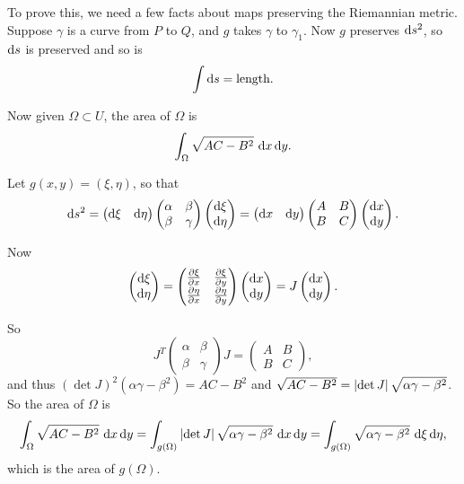 \documentclass{notes}
\theoremstyle{plain}
\begin{document}
To prove this, we need a few facts about maps preserving the Riemannian metric.
Suppose $\gamma$ is a curve from $P$ to $Q$, and $g$ takes $\gamma$ to
$\gamma_1$.  Now $g$ preserves $\mathrm{d} s^2$, so $\mathrm{d} s$ is preserved and so is
\[
\int \mathrm{d} s = \text{length}.
\]

Now given $\Omega \subset U$, the area of $\Omega$ is
\[
\int_\Omega \sqrt{A C - B^2}\ \mathrm{d} x\, \mathrm{d} y.
\]

Let $g(x,y) = (\xi,\eta)$, so that
\[
\mathrm{d} s^2=
\left(
\begin{matrix}
\mathrm{d}\xi & \mathrm{d}\eta
\end{matrix}
\right) \left(
\begin{matrix}
\alpha & \beta \\
\beta & \gamma
\end{matrix}
\right) \left(
\begin{matrix}
\mathrm{d}\xi \\
\mathrm{d}\eta
\end{matrix}
\right)
=
\left(
\begin{matrix}
\mathrm{d} x & \mathrm{d} y
\end{matrix}
\right) \left(
\begin{matrix}
A & B \\
B & C
\end{matrix}
\right) \left(
\begin{matrix}
\mathrm{d} x \\
\mathrm{d} y
\end{matrix}
\right).
\]

Now
\[
\left(
\begin{matrix}
\mathrm{d}\xi \\ \mathrm{d}\eta
\end{matrix}
\right)
=\left(
\begin{matrix}
\frac{\partial \xi}{\partial x} & \frac{\partial \xi}{\partial y} \\
\frac{\partial \eta}{\partial x} & \frac{\partial \eta}{\partial y}
\end{matrix}
\right)
\left(
\begin{matrix}
\mathrm{d} x \\ \mathrm{d} y
\end{matrix}
\right) = J \left(
\begin{matrix}
\mathrm{d} x \\ \mathrm{d} y
\end{matrix}
\right).
\]

So
\[
J^T \left(
\begin{matrix}
\alpha & \beta \\
\beta & \gamma
\end{matrix}
\right) J = \left(
\begin{matrix}
A & B \\
B & C
\end{matrix}
\right),
\]
and thus $(\det J)^2 (\alpha \gamma - \beta^2) = A C - B^2$ and
$\sqrt{A C - B^2} = \left|\det J\right| \sqrt{\alpha \gamma - \beta^2}$.  So the
area of $\Omega$ is
\[
\int_\Omega \sqrt{A C - B^2}\ \mathrm{d} x\, \mathrm{d} y = \int_{g(\Omega)} \left|\det J\right|
\sqrt{\alpha \gamma - \beta^2}\ \mathrm{d} x\, \mathrm{d} y =
\int_{g(\Omega)} \sqrt{\alpha \gamma - \beta^2}\ \mathrm{d}\xi\, \mathrm{d}\eta,
\]
which is the area of $g(\Omega)$.
\end{document}
